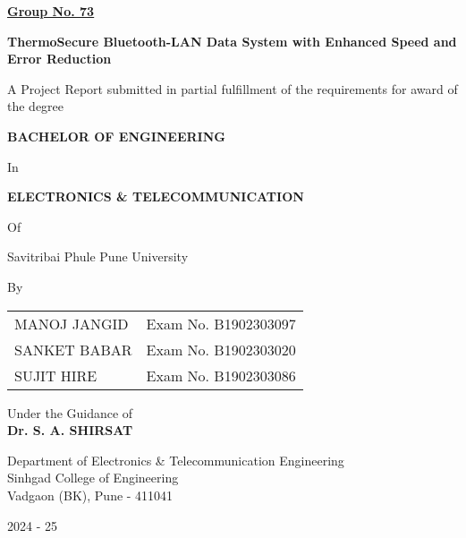 \documentclass[12pt]{report}
\newcommand{\projecttitle}{ThermoSecure Bluetooth-LAN Data System with Enhanced Speed and Error Reduction}
\newcommand{\university}{Savitribai Phule Pune University}
\newcommand{\college}{Sinhgad College of Engineering}
\newcommand{\department}{Department of Electronics \& Telecommunication Engineering}
\newcommand{\location}{Vadgaon (BK), Pune - 411041}
\begin{document}
\begin{titlepage}
    \centering
    \vspace*{1cm}
    
    \underline{\textbf{Group No. 73}}\\
    \vspace{0.5cm}
    
    \textbf{\Large \projecttitle}\\
    \vspace{1.5cm}
    
    A Project Report submitted in partial fulfillment of the requirements for award of the degree\\
    \vspace{0.5cm}
    
    \textbf{BACHELOR OF ENGINEERING}\\
    \vspace{0.5cm}
    
    In\\
    \vspace{0.5cm}
    
    \textbf{ELECTRONICS \& TELECOMMUNICATION}\\
    \vspace{0.5cm}
    
    Of\\
    \vspace{0.5cm}
    
    \university\\
    \vspace{1.5cm}
    
    By\\
    \vspace{0.5cm}
    \begin{tabular}{l l}
        MANOJ JANGID & Exam No. B1902303097 \\
        SANKET BABAR & Exam No. B1902303020 \\
        SUJIT HIRE & Exam No. B1902303086 \\
    \end{tabular}
    \vspace{1.5cm}
    
    Under the Guidance of\\
    \vspace{0.5cm}
    \textbf{Dr. S. A. SHIRSAT}\\
    \vspace{1cm}
    
    \department\\
    \college\\
    \location\\
    \vspace{0.5cm}
    
    2024 - 25
\end{titlepage}
\end{document}
